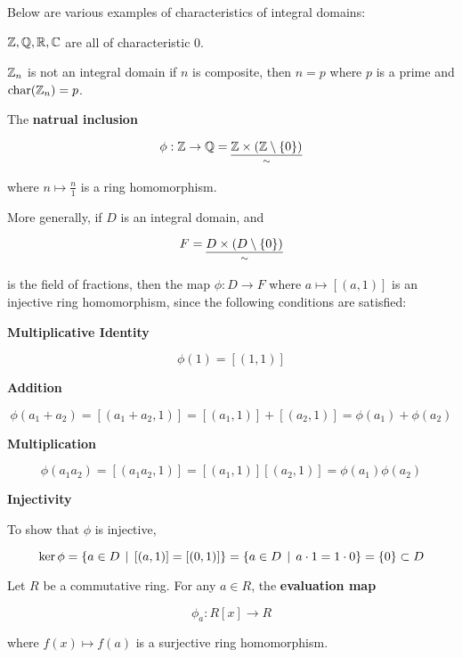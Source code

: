 \documentclass[a4paper,12pt]{article}
\begin{document}
\begin{exm}
  Below are various examples of characteristics of integral domains:

  \begin{alist}
    \item $\mathbb{Z},\mathbb{Q},\mathbb{R},\mathbb{C}$ are all of characteristic $0$.

    \item $\mathbb{Z}_{n}$ is not an integral domain if $n$ is composite, then $n=p$ where $p$ is a prime and $\mathrm{char}(\mathbb{Z}_{n})=p$.

    \item The \textbf{natrual inclusion}

    $$\phi:\mathbb{Z}\to\mathbb{Q}=\underset{\sim}{\underline{\mathbb{Z}\times(\mathbb{Z}\setminus\left\{ 0\right\})}}$$\s

    where $n\mapsto\frac{n}{1}$ is a ring homomorphism.\n

    More generally, if $D$ is an integral domain, and

    $$F=\underset{\sim}{\underline{D\times(D\setminus\left\{ 0\right\})}}$$\s

    is the field of fractions, then the map $\phi:D\to F$ where $a\mapsto[(a,1)]$ is an injective ring homomorphism, since the following conditions are satisfied:

    \begin{rlist}
      \item \textbf{Multiplicative Identity}

      $$\phi(1)=[(1,1)]$$

      \item \textbf{Addition}

      $$\phi(a_{1}+a_{2})=[(a_{1}+a_{2},1)]=[(a_{1},1)]+[(a_{2},1)]=\phi(a_{1})+\phi(a_{2})$$

      \item \textbf{Multiplication}

      $$\phi(a_{1}a_{2})=[(a_{1}a_{2},1)]=[(a_{1},1)][(a_{2},1)]=\phi(a_{1})\phi(a_{2})$$

      \item \textbf{Injectivity}\n

      To show that $\phi$ is injective,\m\m

      $$\ker\phi=\left\{ a\in D\,\mid\,[(a,1)]=[(0,1)]\right\}=\left\{ a\in D\,\mid\, a\cdot 1=1\cdot 0\right\}=\left\{ 0\right\}\subset D$$
    \end{rlist}

    \item Let $R$ be a commutative ring. For any $a\in R$, the \textbf{evaluation map}

    $$\phi_{a}:R[x]\to R$$\s

    where $f(x)\mapsto f(a)$ is a surjective ring homomorphism.
  \end{alist}
\end{exm}
\end{document}
